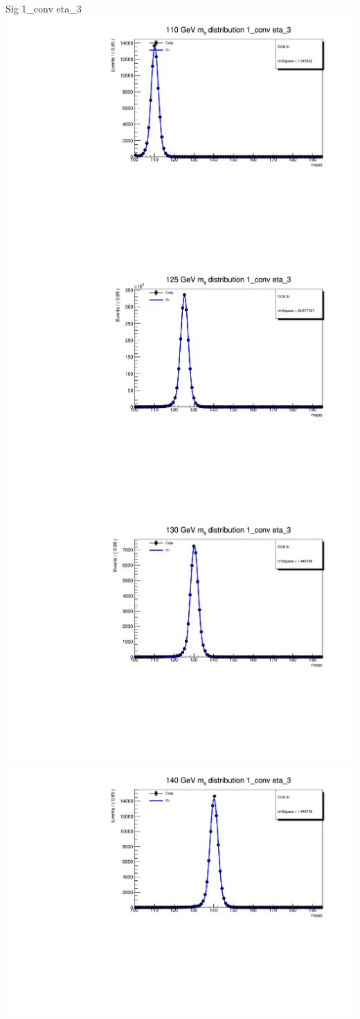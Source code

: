 \documentclass[10pt,UKenglish, leqno, xcolor = dvipsnames]{beamer}
\begin{document}
		\begin{frame}{Sig 1\_conv eta\_3}
			\vfill
			\centering
			\includegraphics[width=.45\textwidth]{../images/week_10/PowhegPy8_NNLOPS_ggH110_1_conv_eta_3_fit.pdf}
			\includegraphics[width=.45\textwidth]{../images/week_10/PowhegPy8_NNLOPS_ggH125_1_conv_eta_3_fit.pdf}\\
			\includegraphics[width=.45\textwidth]{../images/week_10/PowhegPy8_NNLOPS_ggH130_1_conv_eta_3_fit.pdf}
			\includegraphics[width=.45\textwidth]{../images/week_10/PowhegPy8_NNLOPS_ggH140_1_conv_eta_3_fit.pdf}
			\vfill
		\end{frame}
	
\end{document}
